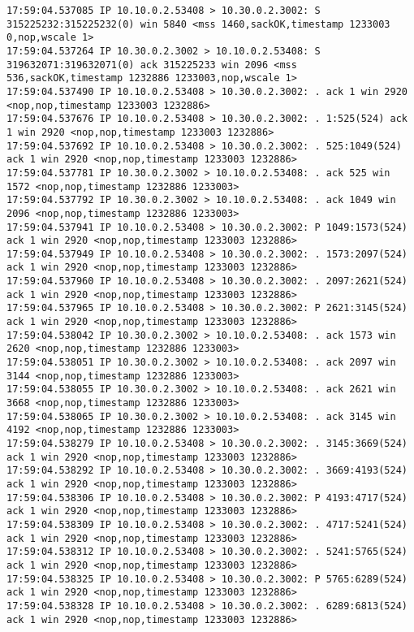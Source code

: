 \documentclass[a4paper,12pt]{article}
\begin{document}
\begin{Verbatim}
17:59:04.537085 IP 10.10.0.2.53408 > 10.30.0.2.3002: S 315225232:315225232(0) win 5840 <mss 1460,sackOK,timestamp 1233003 0,nop,wscale 1>
17:59:04.537264 IP 10.30.0.2.3002 > 10.10.0.2.53408: S 319632071:319632071(0) ack 315225233 win 2096 <mss 536,sackOK,timestamp 1232886 1233003,nop,wscale 1>
17:59:04.537490 IP 10.10.0.2.53408 > 10.30.0.2.3002: . ack 1 win 2920 <nop,nop,timestamp 1233003 1232886>
17:59:04.537676 IP 10.10.0.2.53408 > 10.30.0.2.3002: . 1:525(524) ack 1 win 2920 <nop,nop,timestamp 1233003 1232886>
17:59:04.537692 IP 10.10.0.2.53408 > 10.30.0.2.3002: . 525:1049(524) ack 1 win 2920 <nop,nop,timestamp 1233003 1232886>
17:59:04.537781 IP 10.30.0.2.3002 > 10.10.0.2.53408: . ack 525 win 1572 <nop,nop,timestamp 1232886 1233003>
17:59:04.537792 IP 10.30.0.2.3002 > 10.10.0.2.53408: . ack 1049 win 2096 <nop,nop,timestamp 1232886 1233003>
17:59:04.537941 IP 10.10.0.2.53408 > 10.30.0.2.3002: P 1049:1573(524) ack 1 win 2920 <nop,nop,timestamp 1233003 1232886>
17:59:04.537949 IP 10.10.0.2.53408 > 10.30.0.2.3002: . 1573:2097(524) ack 1 win 2920 <nop,nop,timestamp 1233003 1232886>
17:59:04.537960 IP 10.10.0.2.53408 > 10.30.0.2.3002: . 2097:2621(524) ack 1 win 2920 <nop,nop,timestamp 1233003 1232886>
17:59:04.537965 IP 10.10.0.2.53408 > 10.30.0.2.3002: P 2621:3145(524) ack 1 win 2920 <nop,nop,timestamp 1233003 1232886>
17:59:04.538042 IP 10.30.0.2.3002 > 10.10.0.2.53408: . ack 1573 win 2620 <nop,nop,timestamp 1232886 1233003>
17:59:04.538051 IP 10.30.0.2.3002 > 10.10.0.2.53408: . ack 2097 win 3144 <nop,nop,timestamp 1232886 1233003>
17:59:04.538055 IP 10.30.0.2.3002 > 10.10.0.2.53408: . ack 2621 win 3668 <nop,nop,timestamp 1232886 1233003>
17:59:04.538065 IP 10.30.0.2.3002 > 10.10.0.2.53408: . ack 3145 win 4192 <nop,nop,timestamp 1232886 1233003>
17:59:04.538279 IP 10.10.0.2.53408 > 10.30.0.2.3002: . 3145:3669(524) ack 1 win 2920 <nop,nop,timestamp 1233003 1232886>
17:59:04.538292 IP 10.10.0.2.53408 > 10.30.0.2.3002: . 3669:4193(524) ack 1 win 2920 <nop,nop,timestamp 1233003 1232886>
17:59:04.538306 IP 10.10.0.2.53408 > 10.30.0.2.3002: P 4193:4717(524) ack 1 win 2920 <nop,nop,timestamp 1233003 1232886>
17:59:04.538309 IP 10.10.0.2.53408 > 10.30.0.2.3002: . 4717:5241(524) ack 1 win 2920 <nop,nop,timestamp 1233003 1232886>
17:59:04.538312 IP 10.10.0.2.53408 > 10.30.0.2.3002: . 5241:5765(524) ack 1 win 2920 <nop,nop,timestamp 1233003 1232886>
17:59:04.538325 IP 10.10.0.2.53408 > 10.30.0.2.3002: P 5765:6289(524) ack 1 win 2920 <nop,nop,timestamp 1233003 1232886>
17:59:04.538328 IP 10.10.0.2.53408 > 10.30.0.2.3002: . 6289:6813(524) ack 1 win 2920 <nop,nop,timestamp 1233003 1232886>

\end{Verbatim}
\end{document}
